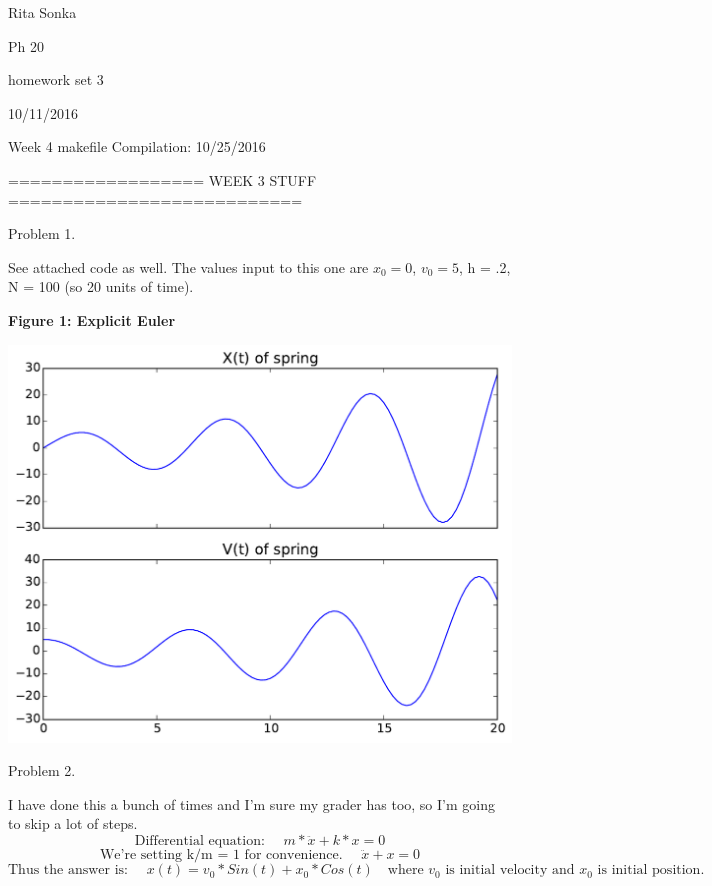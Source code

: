 \documentclass{article}
\begin{document}
Rita Sonka

Ph 20

homework set 3

10/11/2016

Week 4 makefile Compilation: 10/25/2016

\bigskip

================== WEEK 3 STUFF ===========================

\bigskip

Problem 1.

See attached code as well. The values input to this one are $x_{0} = 0$, $v_{0} = 5$, h = .2, N = 100 (so 20 units of time).
\begin{center}
    \textbf{Figure 1: Explicit Euler}\par\medskip
    \includegraphics[scale=1.0]{explicitEuler1}
\end{center}


Problem 2. 

I have done this a bunch of times and I'm sure my grader has too, so I'm going to skip a lot of steps.
\begin{equation}
   \textrm{Differential equation: } \quad  m * \ddot{x} + k * x = 0 
\end{equation}
\begin{equation}
   \textrm{We're setting k/m = 1 for convenience. } \quad \ddot{x} + x = 0 
\end{equation}
\begin{equation}
   \textrm{Thus the answer is: } \quad  x(t) = v_{0}*Sin(t) + x_{0}*Cos(t) \quad \textrm{where $v_{0}$ is initial velocity and $x_{0}$ is initial position. }
\end{equation}
\end{document}
